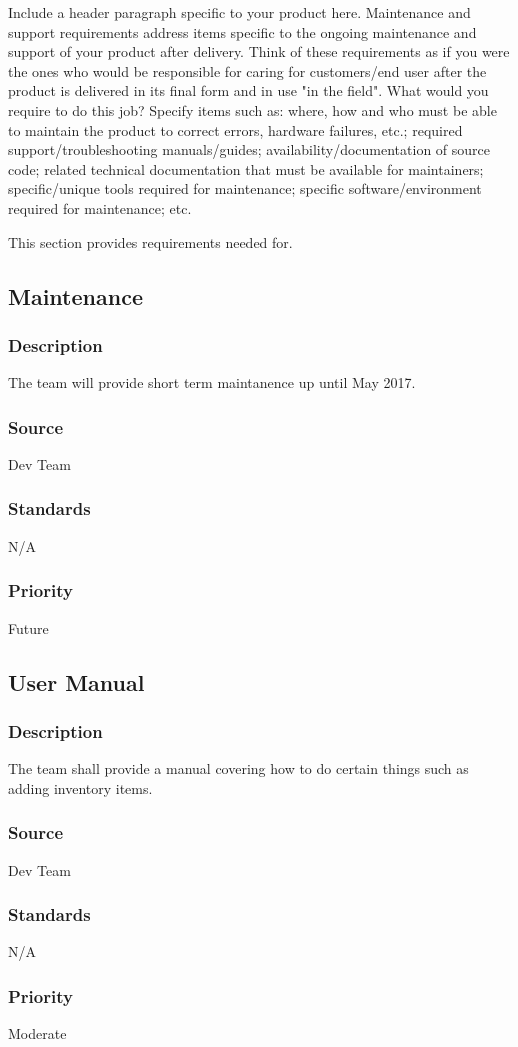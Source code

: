 Include a header paragraph specific to your product here. Maintenance and support requirements address items specific to the ongoing maintenance and support of your product after delivery. Think of these requirements as if you were the ones who would be responsible for caring for customers/end user after the product is delivered in its final form and in use "in the field". What would you require to do this job? Specify items such as: where, how and who must be able to maintain the product to correct errors, hardware failures, etc.; required support/troubleshooting manuals/guides; availability/documentation of source code; related technical documentation that must be available for maintainers; specific/unique tools required for maintenance; specific software/environment required for maintenance; etc.

This section provides requirements needed for.

\subsection{Maintenance}
\subsubsection{Description}
The team will provide short term maintanence up until May 2017.
\subsubsection{Source}
Dev Team
\subsubsection{Standards}
N/A
\subsubsection{Priority}
Future

\subsection{User Manual}
\subsubsection{Description}
The team shall provide a manual covering how to do certain things such as adding inventory items.
\subsubsection{Source}
Dev Team
\subsubsection{Standards}
N/A
\subsubsection{Priority}
Moderate